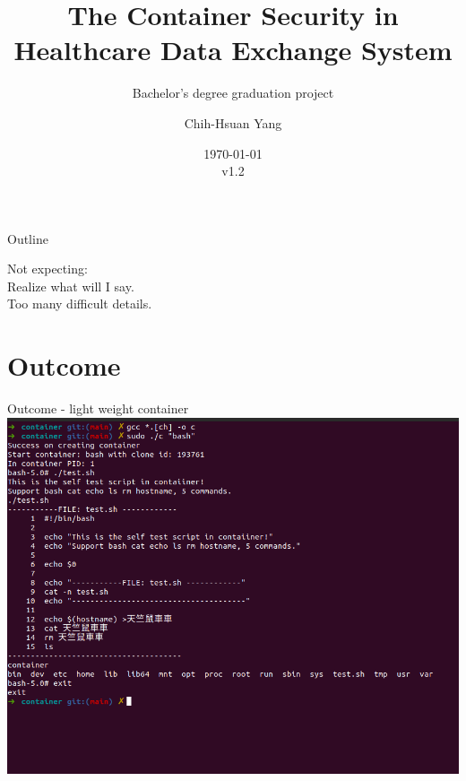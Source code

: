 \documentclass{beamer}
\title{The Container Security in Healthcare Data Exchange System}
\subtitle{Bachelor's degree graduation project}
\author{Chih-Hsuan Yang}
\institute{National Sun Yat-sen University\\
Advisor: Chun-I Fan
}
\date{\today\\v1.2}
\begin{document}
\begin{frame}
    \titlepage
\end{frame}

\begin{frame}{Outline}
    \begin{multicols}{2}
        \tableofcontents
    \end{multicols}
\end{frame}

\begin{frame}
    \begin{center}
        \Large{Not expecting:}\\
        \huge{Realize what will I say.}\\
        \footnotesize{Too many difficult details.}
    \end{center}
\end{frame}

\section{Outcome}
\begin{frame}{Outcome - light weight container}
    \centering\includegraphics[width=.9\textwidth]{lc.png}
\end{frame}
\end{document}
